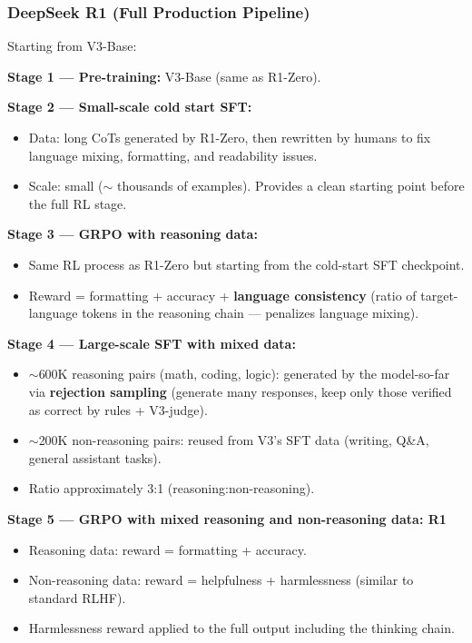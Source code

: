 \documentclass[11pt, a4paper]{article}
\begin{document}
\subsubsection{DeepSeek R1 (Full Production Pipeline)}

\begin{orangebox}
Starting from V3-Base:

\textbf{Stage 1 --- Pre-training:} V3-Base (same as R1-Zero).

\textbf{Stage 2 --- Small-scale cold start SFT:}
\begin{itemize}[leftmargin=1.5em]
  \item Data: long CoTs generated by R1-Zero, then rewritten by humans to fix language mixing, formatting, and readability issues.
  \item Scale: small ($\sim$ thousands of examples). Provides a clean starting point before the full RL stage.
\end{itemize}

\textbf{Stage 3 --- GRPO with reasoning data:}
\begin{itemize}[leftmargin=1.5em]
  \item Same RL process as R1-Zero but starting from the cold-start SFT checkpoint.
  \item Reward = formatting + accuracy + \textbf{language consistency} (ratio of target-language tokens in the reasoning chain --- penalizes language mixing).
\end{itemize}

\textbf{Stage 4 --- Large-scale SFT with mixed data:}
\begin{itemize}[leftmargin=1.5em]
  \item $\sim$600K reasoning pairs (math, coding, logic): generated by the model-so-far via \textbf{rejection sampling} (generate many responses, keep only those verified as correct by rules + V3-judge).
  \item $\sim$200K non-reasoning pairs: reused from V3's SFT data (writing, Q\&A, general assistant tasks).
  \item Ratio approximately 3:1 (reasoning:non-reasoning).
\end{itemize}

\textbf{Stage 5 --- GRPO with mixed reasoning and non-reasoning data: R1}
\begin{itemize}[leftmargin=1.5em]
  \item Reasoning data: reward = formatting + accuracy.
  \item Non-reasoning data: reward = helpfulness + harmlessness (similar to standard RLHF).
  \item Harmlessness reward applied to the full output including the thinking chain.
\end{itemize}
\end{orangebox}
\end{document}
